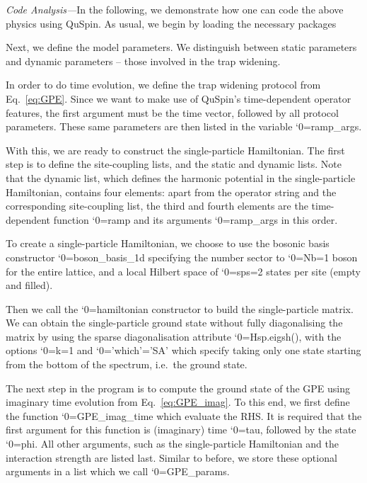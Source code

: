 \documentclass{SciPost}
\newcommand\0{\scalebox{-1}[1]{0}}
\let\svttfamily\ttfamily
\renewcommand\ttfamily{\svttfamily\catcode`0=\active }
\renewcommand\texttt{\bgroup\ttfamily\texttthelp}
\def\texttthelp#1{#1\egroup}
\newcommand{\GPcode}{example4.py}
\begin{document}
\noindent\emph{Code Analysis---}In the following, we demonstrate how one can code the above physics using QuSpin. As usual, we begin by loading the necessary packages

Next, we define the model parameters. We distinguish between static parameters and dynamic parameters -- those involved in the trap widening.

In order to do time evolution, we define the trap widening protocol from Eq.~\eqref{eq:GPE}. Since we want to make use of QuSpin's time-dependent operator features, the first argument must be the time vector, followed by all protocol parameters. These same parameters are then listed in the variable \texttt{ramp\_args}.

With this, we are ready to construct the single-particle Hamiltonian. The first step is to define the site-coupling lists, and the static and dynamic lists. Note that the dynamic list, which defines the harmonic potential in the single-particle Hamiltonian, contains four elements: apart from the operator string and the corresponding site-coupling list, the third and fourth elements are the time-dependent function \texttt{ramp} and its arguments \texttt{ramp\_args} in this order.

To create a single-particle Hamiltonian, we choose to use the bosonic basis constructor \texttt{boson\_basis\_1d} specifying the number sector to \texttt{Nb=1} boson for the entire lattice, and a local Hilbert space of \texttt{sps=2} states per site (empty and filled). 

Then we call the \texttt{hamiltonian} constructor to build the single-particle matrix. We can obtain the single-particle ground state without fully diagonalising the matrix by using the sparse diagonalisation attribute \texttt{Hsp.eigsh()}, with the options \texttt{k=1} and \texttt{'which'='SA'} which specify taking only one state starting from the bottom of the spectrum, i.e.~the ground state.	

The next step in the program is to compute the ground state of the GPE using imaginary time evolution from Eq.~\eqref{eq:GPE_imag}. To this end, we first define the function \texttt{GPE\_imag\_time} which evaluate the RHS. It is required that the first argument for this function is (imaginary) time \texttt{tau}, followed by the state \texttt{phi}. All other arguments, such as the single-particle Hamiltonian and the interaction strength are listed last. Similar to before, we store these optional arguments in a list which we call \texttt{GPE\_params}. 
\end{document}
